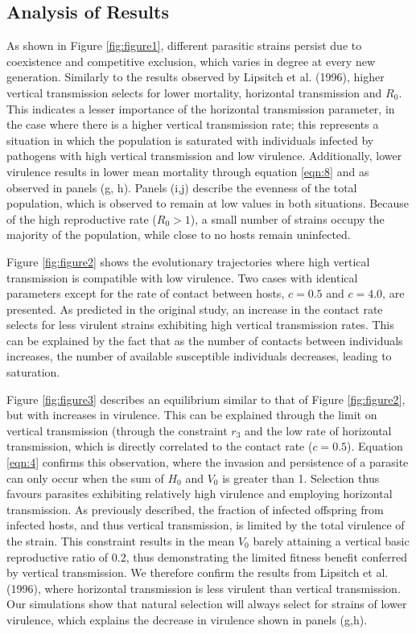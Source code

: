 \subsection{Analysis of Results}
As shown in Figure \ref{fig:figure1}, different parasitic strains persist due
to coexistence and competitive exclusion, which varies in degree at every new
generation. Similarly to the results observed by Lipsitch et al.
(1996)\supercite{Lipsitch:1996}, higher vertical transmission selects for lower
mortality, horizontal transmission and $R_0$. This indicates a lesser importance
of the horizontal transmission parameter, in the case where there is a higher
vertical transmission rate; this represents a situation in which the population
is saturated with individuals infected by pathogens with high vertical
transmission and low virulence. Additionally, lower virulence results in lower
mean mortality through equation \ref{eqn:8} and as observed in panels (g, h).
Panels (i,j) describe the evenness of the total population, which is observed
to remain at low values in both situations. Because of the high reproductive
rate ($R_0 > 1$), a small number of strains occupy the majority of the
population, while close to no hosts remain uninfected.

Figure \ref{fig:figure2} shows the evolutionary trajectories where high vertical
transmission is compatible with low virulence. Two cases with identical
parameters except for the rate of contact between hosts, $c = 0.5$ and
$c = 4.0$, are presented. As predicted in the original study, an increase in the
contact rate selects for less virulent strains exhibiting high vertical
transmission rates. This can be explained by the fact that as the number of
contacts between individuals increases, the number of available susceptible
individuals decreases, leading to saturation.

Figure \ref{fig:figure3} describes an equilibrium similar to that of Figure
\ref{fig:figure2}, but with increases in virulence. This can be explained
through the limit on vertical transmission (through the constraint $r_3$ \in
[0, $r_1$] and the low rate of horizontal transmission, which is directly
correlated to the contact rate ($c = 0.5$). Equation \ref{eqn:4} confirms this
observation, where the invasion and persistence of a parasite can only occur
when the sum of $H_0$ and $V_0$ is greater than 1. Selection thus favours
parasites exhibiting relatively high virulence and employing horizontal
transmission. As previously described, the fraction of infected offspring from
infected hosts, and thus vertical transmission, is limited by the total
virulence of the strain. This constraint results in the mean $V_0$ barely
attaining a vertical basic reproductive ratio of 0.2, thus demonstrating the
limited fitness benefit conferred by vertical transmission. We therefore
confirm the results from Lipsitch et al. (1996)\supercite{Lipsitch:1996}, where
horizontal transmission is less virulent than vertical transmission. Our
simulations show that natural selection will always select for strains of lower
virulence, which explains the decrease in virulence shown in panels (g,h).

